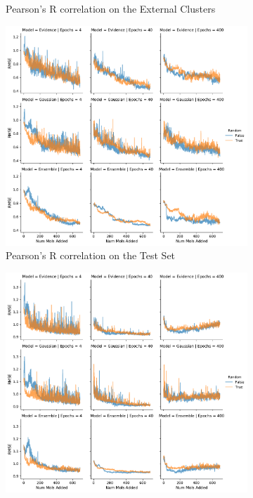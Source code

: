 \documentclass[journal=jmcmar,manuscript=article]{achemso}
\begin{document}
\begin{figure}[tbph]
\begin{subfigure}[b]{0.48\textwidth}
        \caption{Pearson's R correlation on the External Clusters}
    \end{subfigure}%
    \hfill
    \begin{subfigure}[b]{0.48\textwidth}
        \includegraphics[width=1\linewidth]{figures/fig8_morgan_fp_bigmodel_RMSE.pdf}
        \caption{Pearson's R correlation on the Test Set}
    \end{subfigure}%
    \hfill
    \begin{subfigure}[b]{0.48\textwidth}
        \includegraphics[width=1\linewidth]{figures/fig8_morgan_fp_bigmodel_rest_RMSE.pdf}

\end{subfigure}
\end{figure}
\end{document}
